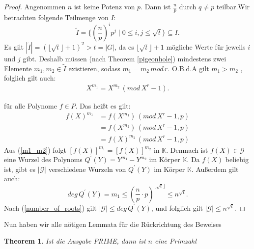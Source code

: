 \documentclass[12pt,oneside]{article}
\newtheorem{theorem}{Theorem}[section]
\theoremstyle{remark}
\theoremstyle{definition}
\begin{document}
\begin{proof}
Angenommen $n$ ist keine Potenz von $p$. Dann ist $\frac{n}{p}$ durch $q \neq p$ teilbar.\newline Wir betrachten folgende Teilmenge von $I$:
\begin{equation}
    \widetilde{I} = \{ (\frac{n}{p})^i p^j \mid 0 \leq i,j \leq \sqrt{t}\} \subseteq I.
\end{equation}
Es gilt $|\widetilde{I}| = (\lfloor \sqrt{t} \rfloor + 1)^2 > t = |G|$, da es $ \lfloor \sqrt{t} \rfloor + 1$  mögliche Werte für jeweils $i$ und $j$ gibt. Deshalb müssen (nach Theorem \ref{pigeonhole}) mindestens zwei Elemente $m_1,m_2 \in \widetilde{I}$ existieren, sodass $m_1 = m_2 \, mod \, r$. O.B.d.A gilt $m_1 > m_2 $ , folglich gilt auch:\newline
\begin{align*}
    X^{m_1} = X^{m_2} \, (mod \, X^r - 1).
\end{align*}

für alle Polynome $ f \in P$. Das heißt es gilt:\newline
\begin{equation}\label{m1_m2}
    \begin{aligned}
         f(X)^{m_1} &= f(X^{m_1}) \, (mod \, X^r - 1, p) \\
        &= f(X^{m_2}) \, (mod \, X^r - 1,p) \\
        &= f(X)^{m_2} \, (mod \, X^r - 1,p)
    \end{aligned}
\end{equation}
Aus (\ref{m1_m2}) folgt $[f(X)]^{m_1} = [f(X)]^{m_2}$ in $\mathbb{K}$. Demnach ist $f(X) \in  \mathcal{G}$ eine Wurzel des Polynoms $Q^{'}(Y) = Y^{m_1} - Y^{m_2}$ im Körper $\mathbb{K}$. Da $f(X)$ beliebig ist, gibt es $|\mathcal{G}|$ verschiedene Wurzeln von $Q^{'}(Y)$ im Körper $\mathbb{K}$. Außerdem gilt auch:
\begin{equation}\label{degQ}
    deg \, Q^{'}(Y) = m_1 \leq (\frac{n}{p} \cdot p)^{\lfloor \sqrt{t} \rfloor} \leq n^{\sqrt{t}}. 
\end{equation}
Nach (\ref{number_of_roots}) gilt $|\mathcal{G}| \leq deg \, Q^{'}(Y)$, und folglich gilt $|\mathcal{G}| \leq n^{\sqrt{t}}$.\newline\newline
\end{proof}

Nun haben wir alle nötigen Lemmata für die Rückrichtung des Beweises

\begin{theorem}\label{rueck_rich}
Ist die Ausgabe PRIME, dann ist $n$ eine Primzahl 
\end{theorem}
\end{document}
